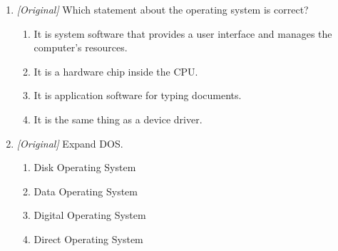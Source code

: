 \begin{enumerate}[label=\textbf{Q\arabic*.}, leftmargin=*]
\begin{enumerate}[label=\Alph*.]
    \item registers only
    \item the printer buffer
  \end{enumerate}
\item \textit{[Original]} Which statement about the operating system is
  correct?
  \begin{enumerate}[label=\Alph*.]
    \item It is system software that provides a user interface and manages
      the computer's resources.
    \item It is a hardware chip inside the CPU.
    \item It is application software for typing documents.
    \item It is the same thing as a device driver.
  \end{enumerate}
\item \textit{[Original]} Expand DOS.
  \begin{enumerate}[label=\Alph*.]
    \item Disk Operating System
    \item Data Operating System
    \item Digital Operating System
    \item Direct Operating System
  \end{enumerate}


\end{enumerate}
